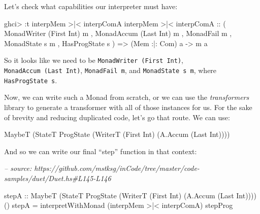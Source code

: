 \documentclass[]{article}
\newenvironment{Shaded}{}{}
\newcommand{\CommentTok}[1]{\textcolor[rgb]{0.38,0.63,0.69}{\textit{#1}}}
\newcommand{\DataTypeTok}[1]{\textcolor[rgb]{0.56,0.13,0.00}{#1}}
\newcommand{\FunctionTok}[1]{\textcolor[rgb]{0.02,0.16,0.49}{#1}}
\newcommand{\NormalTok}[1]{#1}
\newcommand{\OtherTok}[1]{\textcolor[rgb]{0.00,0.44,0.13}{#1}}
\begin{document}
Let's check what capabilities our interpreter must have:

\begin{Shaded}
\begin{Highlighting}[]
\NormalTok{ghci}\FunctionTok{>} \FunctionTok{:}\NormalTok{t interpMem }\FunctionTok{>|<}\NormalTok{ interpComA}
\NormalTok{interpMem }\FunctionTok{>|<}\NormalTok{ interpComA}
\OtherTok{    ::}\NormalTok{ ( }\DataTypeTok{MonadWriter}\NormalTok{ (}\DataTypeTok{First} \DataTypeTok{Int}\NormalTok{) m}
\NormalTok{       , }\DataTypeTok{MonadAccum}\NormalTok{ (}\DataTypeTok{Last} \DataTypeTok{Int}\NormalTok{) m}
\NormalTok{       , }\DataTypeTok{MonadFail}\NormalTok{ m}
\NormalTok{       , }\DataTypeTok{MonadState}\NormalTok{ s m}
\NormalTok{       , }\DataTypeTok{HasProgState}\NormalTok{ s}
\NormalTok{       )}
    \OtherTok{=>}\NormalTok{ (}\DataTypeTok{Mem} \FunctionTok{:|:} \DataTypeTok{Com}\NormalTok{) a}
    \OtherTok{->}\NormalTok{ m a}
\end{Highlighting}
\end{Shaded}

So it looks like we need to be \texttt{MonadWriter\ (First\ Int)},
\texttt{MonadAccum\ (Last\ Int)}, \texttt{MonadFail\ m}, and
\texttt{MonadState\ s\ m}, where \texttt{HasProgState\ s}.

Now, we can write such a Monad from scratch, or we can use the
\emph{transformers} library to generate a transformer with all of those
instances for us. For the sake of brevity and reducing duplicated code, let's go
that route. We can use:

\begin{Shaded}
\begin{Highlighting}[]
\DataTypeTok{MaybeT}\NormalTok{ (}\DataTypeTok{StateT} \DataTypeTok{ProgState}\NormalTok{ (}\DataTypeTok{WriterT}\NormalTok{ (}\DataTypeTok{First} \DataTypeTok{Int}\NormalTok{) (}\DataTypeTok{A.Accum}\NormalTok{ (}\DataTypeTok{Last} \DataTypeTok{Int}\NormalTok{))))}
\end{Highlighting}
\end{Shaded}

And so we can write our final ``step'' function in that context:

\begin{Shaded}
\begin{Highlighting}[]
\CommentTok{-- source: https://github.com/mstksg/inCode/tree/master/code-samples/duet/Duet.hs#L145-L146}

\OtherTok{stepA ::} \DataTypeTok{MaybeT}\NormalTok{ (}\DataTypeTok{StateT} \DataTypeTok{ProgState}\NormalTok{ (}\DataTypeTok{WriterT}\NormalTok{ (}\DataTypeTok{First} \DataTypeTok{Int}\NormalTok{) (}\DataTypeTok{A.Accum}\NormalTok{ (}\DataTypeTok{Last} \DataTypeTok{Int}\NormalTok{)))) ()}
\NormalTok{stepA }\FunctionTok{=}\NormalTok{ interpretWithMonad (interpMem }\FunctionTok{>|<}\NormalTok{ interpComA) stepProg}
\end{Highlighting}
\end{Shaded}
\end{document}
